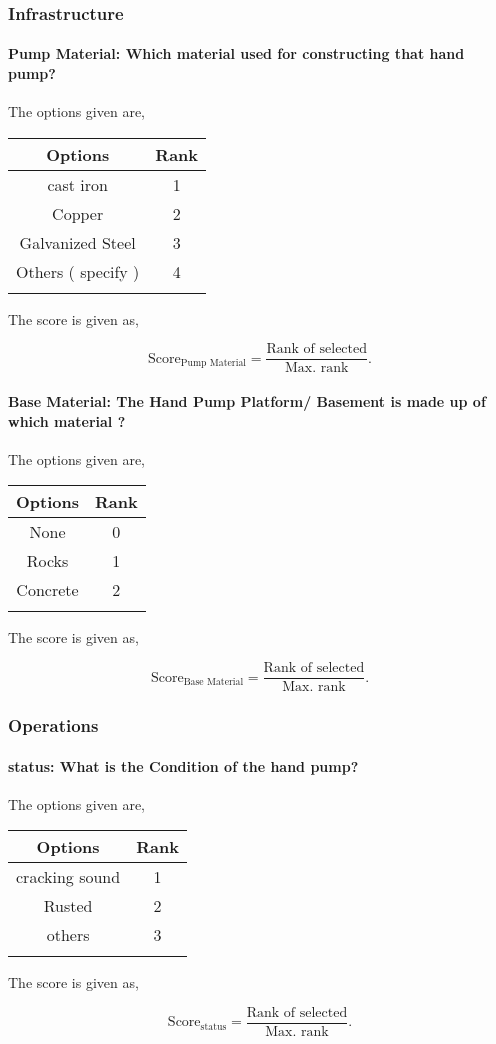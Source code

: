 \documentclass[oneside,twocolumn]{article}
\newcommand{\tsub}[2]{\text{#1}_{\text{#2}}}
\newcommand{\dsub}[2]{\dfrac{\text{#1}}{\text{#2}}}
\newcommand{\singsel}[1]
{
	\[
		\tsub{Score}{#1} = \dsub{Rank of selected}{Max. rank}.
	\]
}
\newenvironment{ttable}
{
\begin{center}
\begin{tabular}{c|c}
\hline
}
{
\\ \hline
\end{tabular}
\end{center}
}
\begin{document}
\subsubsection{Infrastructure}

\paragraph{Pump Material: Which material used for constructing that hand pump? 
}

The options given are,
\begin{ttable}
Options & Rank \\ \hline
cast iron & 1 \\
Copper  & 2 \\
Galvanized Steel & 3 \\
Others ( specify ) & 4 \\
\hline
\end{ttable}
The score is given as,
\singsel{Pump Material}
\paragraph{Base Material: The Hand Pump Platform/ Basement is made up of which material ?}

The options given are,
\begin{ttable}
Options & Rank \\ \hline
None & 0 \\
Rocks & 1 \\
Concrete & 2 \\
\hline
\end{ttable}
The score is given as,
\singsel{Base Material}
\subsubsection{Operations}

\paragraph{status: 
What is the Condition of the hand pump? 
}

The options given are,
\begin{ttable}
Options & Rank \\ \hline
cracking sound & 1 \\
Rusted & 2 \\
others & 3 \\
\hline
\end{ttable}
The score is given as,
\singsel{status}
\end{document}
